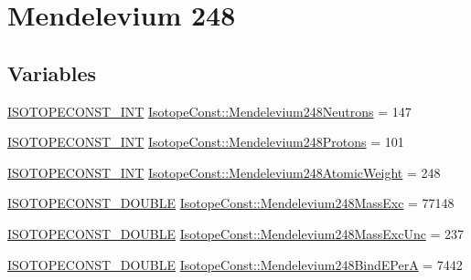 \hypertarget{group___isotope_const-_mendelevium-_md248}{}\section{Mendelevium 248}
\label{group___isotope_const-_mendelevium-_md248}
\subsection*{Variables}
\begin{DoxyCompactItemize}
\item 
\mbox{\hyperlink{group___isotope_const-_macros_ga5f18360b3e99483a35c32d789e62621c}{I\+S\+O\+T\+O\+P\+E\+C\+O\+N\+S\+T\+\_\+\+I\+NT}} \mbox{\hyperlink{group___isotope_const-_mendelevium-_md248_gab777f1768d57cc0372882613951317cf}{Isotope\+Const\+::\+Mendelevium248\+Neutrons}} = 147
\item 
\mbox{\hyperlink{group___isotope_const-_macros_ga5f18360b3e99483a35c32d789e62621c}{I\+S\+O\+T\+O\+P\+E\+C\+O\+N\+S\+T\+\_\+\+I\+NT}} \mbox{\hyperlink{group___isotope_const-_mendelevium-_md248_ga50c4d1db7246bdc1b327ef8feddfd128}{Isotope\+Const\+::\+Mendelevium248\+Protons}} = 101
\item 
\mbox{\hyperlink{group___isotope_const-_macros_ga5f18360b3e99483a35c32d789e62621c}{I\+S\+O\+T\+O\+P\+E\+C\+O\+N\+S\+T\+\_\+\+I\+NT}} \mbox{\hyperlink{group___isotope_const-_mendelevium-_md248_gaab9b8bdf9611aa0f82e50b5bd7bb6111}{Isotope\+Const\+::\+Mendelevium248\+Atomic\+Weight}} = 248
\item 
\mbox{\hyperlink{group___isotope_const-_macros_ga8f45a7272ce02c0b4c65c44636ed719a}{I\+S\+O\+T\+O\+P\+E\+C\+O\+N\+S\+T\+\_\+\+D\+O\+U\+B\+LE}} \mbox{\hyperlink{group___isotope_const-_mendelevium-_md248_ga462abf6390c3e09677c3c838286ecb33}{Isotope\+Const\+::\+Mendelevium248\+Mass\+Exc}} = 77148
\item 
\mbox{\hyperlink{group___isotope_const-_macros_ga8f45a7272ce02c0b4c65c44636ed719a}{I\+S\+O\+T\+O\+P\+E\+C\+O\+N\+S\+T\+\_\+\+D\+O\+U\+B\+LE}} \mbox{\hyperlink{group___isotope_const-_mendelevium-_md248_ga03bac7e7a004833429e2746674523b47}{Isotope\+Const\+::\+Mendelevium248\+Mass\+Exc\+Unc}} = 237
\item 
\mbox{\hyperlink{group___isotope_const-_macros_ga8f45a7272ce02c0b4c65c44636ed719a}{I\+S\+O\+T\+O\+P\+E\+C\+O\+N\+S\+T\+\_\+\+D\+O\+U\+B\+LE}} \mbox{\hyperlink{group___isotope_const-_mendelevium-_md248_ga4b37583db79233b55ceee1ad544d624a}{Isotope\+Const\+::\+Mendelevium248\+Bind\+E\+PerA}} = 7442

\end{DoxyCompactItemize}
